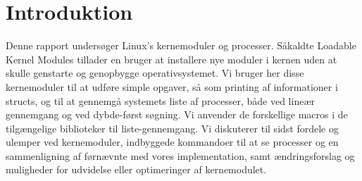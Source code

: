 \chapter{Introduktion}
Denne rapport undersøger Linux's kernemoduler og processer. Såkaldte Loadable Kernel Modules tillader en bruger at installere nye moduler i kernen uden at skulle genstarte og genopbygge operativsystemet. Vi bruger her disse kernemoduler til at udføre simple opgaver, så som printing af informationer i structs, og til at gennemgå systemets liste af processer, både ved lineær gennemgang og ved dybde-først søgning. Vi anvender de forskellige macros i de tilgængelige biblioteker til liste-gennemgang. Vi diskuterer til sidst fordele og ulemper ved kernemoduler, indbyggede kommandoer til at se processer og en sammenligning af førnævnte med vores implementation, samt ændringsforslag og muligheder for udvidelse eller optimeringer af kernemodulet. 